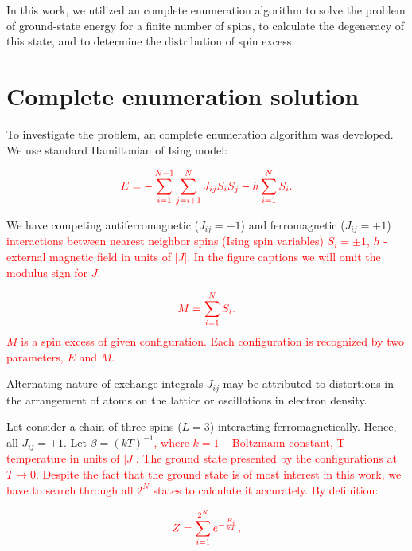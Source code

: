 \documentclass[preprint,12pt]{elsarticle}
\begin{document}
	In this work, we utilized an complete enumeration algorithm \cite{dias2023ground, padalko2021parallel} to solve the problem of ground-state energy for a finite number of spins, to calculate the degeneracy of this state, and to determine the distribution of spin excess.
	
	\section{Complete enumeration solution}
	
	To investigate the problem, an complete enumeration algorithm was developed. We use standard Hamiltonian of Ising model:
	
	\begin{equation}
		\color{red}
		E = -\sum^{N - 1}_{i=1}\sum^N_{j = i + 1} J_{ij} S_i S_j - h \sum^N_{i=1} S_i.
		\label{eq:ising_energy}
	\end{equation}
	
	We have competing antiferromagnetic ($J_{ij} = -1$) and ferromagnetic ($J_{ij} = +1$) \textcolor{red}{interactions between nearest neighbor spins (Ising spin variables) $S_i = \pm1$, $h$ - external magnetic field in units of $|J|$. 
	In the figure captions we will omit the modulus sign for $J$.} 
	
	\begin{equation}
		\color{red}
		M = \sum^N_{i=1} S_i.
		\label{eq:spin_excess} 
	\end{equation}
	\textcolor{red}{$M$ is a spin excess of given configuration. Each configuration is recognized by two parameters, $E$ and $M$.}
	
	
	Alternating nature of exchange integrals $J_{ij}$ may be attributed to distortions in the arrangement of atoms on the lattice or oscillations in electron density.
	
	Let consider a chain of three spins ($L = 3$) interacting ferromagnetically. Hence, all $J_{ij} = +1$. Let $\beta = (kT)^{-1}$\textcolor{red}{, where $k = 1$ -- Boltzmann constant, T -- temperature in units of $|J|$. The ground state presented by the configurations at $T \rightarrow 0$. Despite the fact that the ground state is of most interest in this work, we have to search through all $2^N$ states to calculate it accurately. By definition:}
	
		\begin{equation}
		\color{red}
		Z = \sum_{i = 1}^{2 ^ N} e^{-\frac{E_i}{kT}},
		\label{eq:stat_difinition}
	\end{equation}
	
\end{document}
